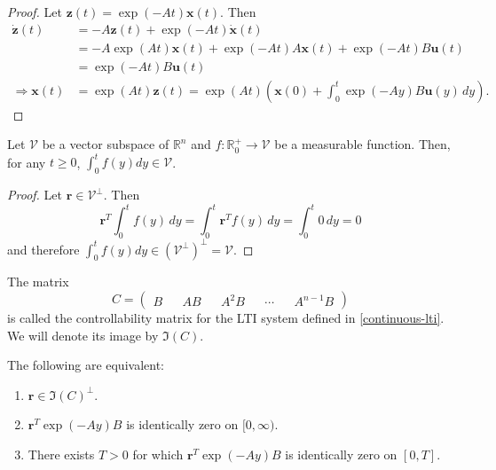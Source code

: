 \begin{proof}
Let $\boldsymbol{z}(t) = \exp(-At) \boldsymbol{x}(t)$. Then
\begin{align*}
\dot{\boldsymbol{z}}(t) &= -A \boldsymbol{z}(t) + \exp(-At) \dot{\boldsymbol{x}}(t) \\
&= -A \exp(At) \boldsymbol{x}(t) + \exp(-At) A \boldsymbol{x}(t) + \exp(-At) B \boldsymbol{u}(t) \\
&= \exp(-At) B \boldsymbol{u}(t) \\
\Rightarrow \boldsymbol{x}(t) &= \exp(At) \boldsymbol{z}(t) = \exp(At) \left( \boldsymbol{x}(0) + \int_{0}^{t} \exp(-Ay) B \boldsymbol{u}(y) \, dy \right) .
\end{align*}
\end{proof}

\begin{lemma}
\label{integral-invariance}
Let $\mathcal{V}$ be a vector subspace of $\mathbb{R}^{n}$ and $f : \mathbb{R}^{+}_{0} \rightarrow \mathcal{V}$ be a measurable function. Then, for any $t \geq 0$, $\int_{0}^{t} f(y) dy \in \mathcal{V}$.
\end{lemma}

\begin{proof}
Let $\boldsymbol{r} \in \mathcal{V}^{\perp}$. Then
\begin{equation*}
\boldsymbol{r}^{T} \int_{0}^{t} f(y) \, dy = \int_{0}^{t} \boldsymbol{r}^{T} f(y) \, dy = \int_{0}^{t} 0 \, dy = 0
\end{equation*}
and therefore $\int_{0}^{t} f(y) dy \in (\mathcal{V}^{\perp})^{\perp} = \mathcal{V}$.
\end{proof}

The matrix
\begin{equation}
C= \begin{pmatrix} B && AB && A^{2} B && \cdots && A^{n-1}B \end{pmatrix}
\end{equation}
is called the controllability matrix for the LTI system defined in \cref{continuous-lti}. We will denote its image by $\Im(C)$.

\begin{lemma}
\label{orthogonality-equivalence}
The following are equivalent:
\begin{enumerate}
\item $\boldsymbol{r} \in \Im(C)^{\perp}$.
\item $\boldsymbol{r}^{T} \exp(-Ay) B$ is identically zero on $[0,\infty)$.
\item There exists $T>0$ for which $\boldsymbol{r}^{T} \exp(-Ay) B$ is identically zero on $[0,T]$.
\end{enumerate}
\end{lemma}

